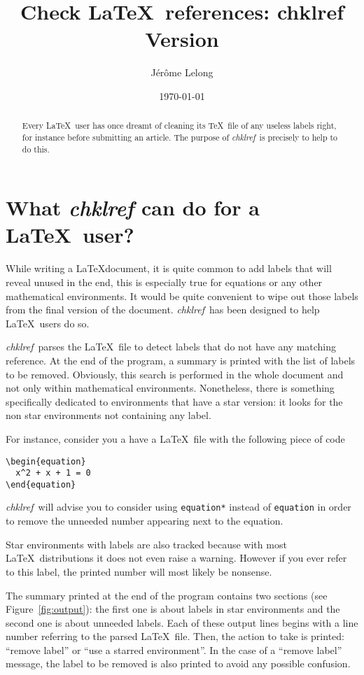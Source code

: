 \documentclass[a4paper,11pt,twoside]{article}
\title{Check \LaTeX\ references: chklref \\
Version }
\date{\today}
\author{Jérôme Lelong}
\def\chk{{\it chklref}}
\begin{document}
\maketitle

\begin{abstract} Every \LaTeX\ user has once dreamt of cleaning its \TeX\ file of any useless labels right, for instance before submitting an article. The purpose of \chk\ is precisely to help to do this.
\end{abstract}

\section{What {\it chklref} can do for a \LaTeX\ user?}

While writing a \LaTeX document, it is quite common to add labels that will reveal unused in the end, this is especially true for equations or any other mathematical environments. It would be quite convenient to wipe out those labels from the final version of the document. \chk\ has been designed to help \LaTeX\ users do so.


\chk\ parses the \LaTeX\ file to detect labels that do not have any matching reference. At the end of the program, a summary is printed with the list of labels to be removed. Obviously, this search is performed in the whole document and not only within mathematical environments. Nonetheless, there is something specifically dedicated to environments that have a star version: it looks for the non star environments not containing any label.

For instance, consider you a have a \LaTeX\ file with the following piece of code
\begin{verbatim}
\begin{equation}
  x^2 + x + 1 = 0
\end{equation}
\end{verbatim}
\chk\ will advise you to consider using \verb!equation*! instead of \verb!equation! in order to remove the unneeded number appearing next to the equation.

Star environments with labels are also tracked because with most \LaTeX\ distributions it does not even raise a warning. However if you ever refer to this label, the printed number will most likely be nonsense.

The summary printed at the end of the program contains two sections (see Figure~\ref{fig:output}): the first one is about labels in star environments and the second one is about unneeded labels. Each of these output lines begins with a line number referring to the parsed \LaTeX\ file. Then, the action to take is printed: ``remove label'' or ``use a starred environment''. In the case of a ``remove label'' message, the label to be removed is also printed to avoid any possible confusion.
\end{document}
